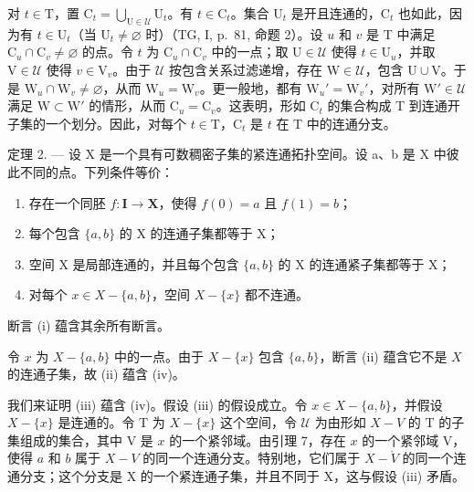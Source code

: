 对 \(t \in \mathrm{T}\)，置 \(\mathrm{C}_t = \bigcup_{\mathrm{U} \in \mathcal{U}} \mathrm{U}_t\)。有 \(t \in \mathrm{C}_t\)。集合 \(\mathrm{U}_t\) 是开且连通的，\(\mathrm{C}_t\) 也如此，因为有 \(t \in \mathrm{U}_t\)（当 \(\mathrm{U}_t \neq \varnothing\) 时）（TG, I, p.~81, 命题 2）。设 \(u\) 和 \(v\) 是 T 中满足 \(\mathrm{C}_u \cap \mathrm{C}_v \neq \varnothing\) 的点。令 \(t\) 为 \(\mathrm{C}_u \cap \mathrm{C}_v\) 中的一点；取 \(\mathrm{U} \in \mathcal{U}\) 使得 \(t \in \mathrm{U}_u\)，并取 \(\mathrm{V} \in \mathcal{U}\) 使得 \(v \in \mathrm{V}_v\)。由于 \(\mathcal{U}\) 按包含关系过滤递增，存在 \(\mathrm{W} \in \mathcal{U}\)，包含 \(\mathrm{U} \cup \mathrm{V}\)。于是 \(\mathrm{W}_u \cap \mathrm{W}_v \neq \varnothing\)，从而 \(\mathrm{W}_u = \mathrm{W}_v\)。更一般地，都有 \(\mathrm{W}_u' = \mathrm{W}_v'\)，对所有 \(\mathrm{W}' \in \mathcal{U}\) 满足 \(\mathrm{W} \subset \mathrm{W}'\) 的情形，从而 \(\mathrm{C}_u = \mathrm{C}_v\)。这表明，形如 \(\mathrm{C}_t\) 的集合构成 T 到连通开子集的一个划分。因此，对每个 \(t \in \mathrm{T}\)，\(\mathrm{C}_t\) 是 \(t\) 在 T 中的连通分支。

定理 2. --- 设 X 是一个具有可数稠密子集的紧连通拓扑空间。设 a、b 是 X 中彼此不同的点。下列条件等价：

\begin{enumerate}
\def\labelenumi{(\roman{enumi})}
\item
  存在一个同胚 \(f\colon\mathbf{I}\to\mathbf{X}\)，使得 \(f(0)=a\) 且 \(f(1)=b\)；
\item
  每个包含 \(\{a, b\}\) 的 X 的连通子集都等于 X；
\item
  空间 X 是局部连通的，并且每个包含 \(\{a,b\}\) 的 X 的连通紧子集都等于 X；
\item
  对每个 \(x \in X - \{a, b\}\)，空间 \(X - \{x\}\) 都不连通。
\end{enumerate}

断言 (i) 蕴含其余所有断言。

令 \(x\) 为 \(X - \{a, b\}\) 中的一点。由于 \(X - \{x\}\) 包含 \(\{a, b\}\)，断言 (ii) 蕴含它不是 \(X\) 的连通子集，故 (ii) 蕴含 (iv)。

我们来证明 (iii) 蕴含 (iv)。假设 (iii) 的假设成立。令 \(x \in X - \{a, b\}\)，并假设 \(X - \{x\}\) 是连通的。令 T 为 \(X - \{x\}\) 这个空间，令 \(\mathcal{U}\) 为由形如 \(X - V\) 的 T 的子集组成的集合，其中 V 是 \(x\) 的一个紧邻域。由引理 7，存在 \(x\) 的一个紧邻域 V，使得 \(a\) 和 \(b\) 属于 \(X - V\) 的同一个连通分支。特别地，它们属于 \(X - \mathring{V}\) 的同一个连通分支；这个分支是 X 的一个紧连通子集，并且不同于 X，这与假设 (iii) 矛盾。

